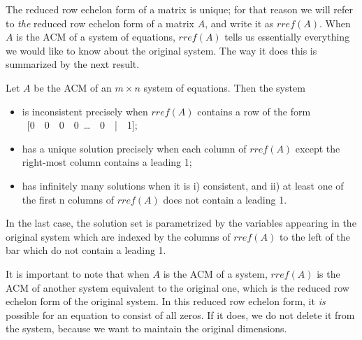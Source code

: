 \documentclass[handout]{ximera}
\numberwithin{equation}{section}
\begin{document}
The reduced row echelon form of a matrix is unique; for that reason we will refer to {\it the} reduced row echelon form of a matrix $A$, and write it as $rref(A)$. When $A$ is the ACM of a system of equations, $rref(A)$ tells us essentially everything we would like to know about the original system. The way it does this is summarized by the next result.

\begin{theorem} Let $A$ be the ACM of an $m\times n$ system of equations. Then the system
\begin{itemize}
\item is inconsistent precisely when $rref(A)$ contains a row of the form
\
[0\ \ 0\ \ 0\ \ 0\ \dots\ \ 0\ \ |\ \ 1];
\
\item has a unique solution precisely when each column of $rref(A)$ except the right-most column contains a leading 1;
\item has infinitely many solutions when it is i) consistent, and ii) at least one of the first n columns of $rref(A)$ does not contain a leading 1.
\end{itemize}
In the last case, the solution set is parametrized by the variables appearing in the original system which are indexed by the columns of $rref(A)$ to the left of the bar which do not contain a leading 1.
\end{theorem}

It is important to note that when $A$ is the ACM of a system, $rref(A)$ is the ACM of another system equivalent to the original one, which is the reduced row echelon form of the original system. In this reduced row echelon form, it {\it is} possible for an equation to consist of all zeros. If it does, we do not delete it from the system, because we want to maintain the original dimensions.
\end{document}
